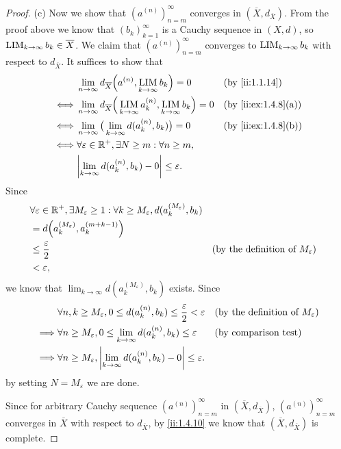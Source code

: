 \begin{proof}{(c)}
  Now we show that \((a^{(n)})_{n = m}^\infty\) converges in \((\overline{X}, d_{\overline{X}})\).
  From the proof above we know that \((b_k)_{k = 1}^\infty\) is a Cauchy sequence in \((X, d)\), so \(\operatorname*{LIM}_{k \to \infty} b_k \in \overline{X}\).
  We claim that \((a^{(n)})_{n = m}^\infty\) converges to \(\operatorname*{LIM}_{k \to \infty} b_k\) with respect to \(d_{\overline{X}}\).
  It suffices to show that
  \begin{align*}
         & \lim_{n \to \infty} d_{\overline{X}}\Big(a^{(n)}, \LIM_{k \to \infty} b_k\Big) = 0                       &  & \by{ii:1.1.14}      \\
    \iff & \lim_{n \to \infty} d_{\overline{X}}\Big(\LIM_{k \to \infty} a_k^{(n)}, \LIM_{k \to \infty} b_k\Big) = 0 &  & \by{ii:ex:1.4.8}[a] \\
    \iff & \lim_{n \to \infty} \big(\lim_{k \to \infty} d(a_k^{(n)}, b_k)\big) = 0                                  &  & \by{ii:ex:1.4.8}[b] \\
    \iff & \forall \varepsilon \in \R^+, \exists N \geq m : \forall n \geq m,                                                                \\
         & \abs{\lim_{k \to \infty} d(a_k^{(n)}, b_k) - 0} \leq \varepsilon.
  \end{align*}
  Since
  \begin{align*}
     & \forall \varepsilon \in \mathbb{R}^+, \exists M_\varepsilon \geq 1 : \forall k \geq M_\varepsilon, d(a_k^{(M_\varepsilon)}, b_k)                                                      \\
     & = d\Big(a_k^{(M_\varepsilon)}, a_k^{(m + k - 1)}\Big)                                                                                                                         \\
     & \leq \dfrac{\varepsilon}{2}                                                                                              &  & \text{(by the definition of \(M_\varepsilon\))} \\
     & < \varepsilon,
  \end{align*}
  we know that \(\lim_{k \to \infty} d(a_k^{(M_\varepsilon)}, b_k)\) exists.
  Since
  \begin{align*}
             & \forall n, k \geq M_\varepsilon, 0 \leq d(a_k^{(n)}, b_k) \leq \dfrac{\varepsilon}{2} < \varepsilon &  & \text{(by the definition of \(M_\varepsilon\))} \\
    \implies & \forall n \geq M_\varepsilon, 0 \leq \lim_{k \to \infty} d(a_k^{(n)}, b_k) \leq \varepsilon         &  & \text{(by comparison test)}                     \\
    \implies & \forall n \geq M_\varepsilon, \left\lvert\lim_{k \to \infty} d(a_k^{(n)}, b_k) - 0\right\rvert \leq \varepsilon.
  \end{align*}
  by setting \(N = M_\varepsilon\) we are done.

  Since for arbitrary Cauchy sequence \((a^{(n)})_{n = m}^\infty\) in \((\overline{X}, d_{\overline{X}})\), \((a^{(n)})_{n = m}^\infty\) converges in \(\overline{X}\) with respect to \(d_{\overline{X}}\), by \cref{ii:1.4.10} we know that \((\overline{X}, d_{\overline{X}})\) is complete.
\end{proof}

